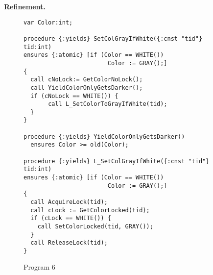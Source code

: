 {\bf Refinement.}

\begin{figure}
\begin{verbatim}
var Color:int;

procedure {:yields} SetColGrayIfWhite({:cnst "tid"} tid:int)
ensures {:atomic} [if (Color == WHITE())
                        Color := GRAY();]
{
  call cNoLock:= GetColorNoLock();
  call YieldColorOnlyGetsDarker();
  if (cNoLock == WHITE()) {
       call L_SetColorToGrayIfWhite(tid);
  }
}

procedure {:yields} YieldColorOnlyGetsDarker()
  ensures Color >= old(Color);

procedure {:yields} L_SetColGrayIfWhite({:cnst "tid"} tid:int)
ensures {:atomic} [if (Color == WHITE())
                        Color := GRAY();]
{
  call AcquireLock(tid);
  call cLock := GetColorLocked(tid);
  if (cLock == WHITE()) {
    call SetColorLocked(tid, GRAY());
  } 
  call ReleaseLock(tid);
}
\end{verbatim}
\caption{Program 6}
\label{fig:ex5}
\end{figure}


